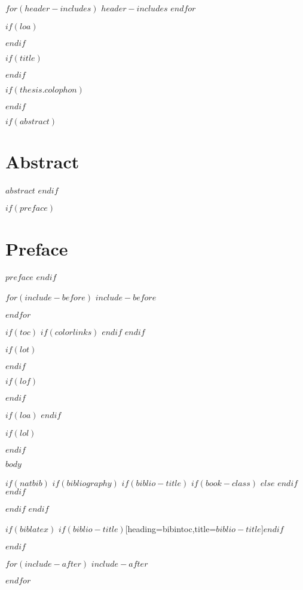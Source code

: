 $for(header-includes)$
  $header-includes$
$endfor$

$if(loa)$
\makeglossaries

$endif$



$if(title)$
\prefrontmatter

\cleartoevenpage

$endif$

$if(thesis.colophon)$

\cleartooddpage
$endif$

\frontmatter

$if(abstract)$
\chapter*{Abstract}
\setcounter{chapter}{0}
$abstract$
\clearforchapter
$endif$

$if(preface)$
\chapter*{Preface}
\setcounter{chapter}{0}
$preface$
\clearforchapter
$endif$

$for(include-before)$
$include-before$

$endfor$

$if(toc)$
{
$if(colorlinks)$
  \hypersetup{linkcolor=$if(toccolor)$$toccolor$$else$black$endif$}
$endif$
\setcounter{tocdepth}{$toc-depth$}
\tableofcontents
}
\clearforchapter
$endif$

$if(lot)$
\listoftables
\clearforchapter
$endif$

$if(lof)$
\listoffigures
\clearforchapter
$endif$

$if(loa)$
$endif$

$if(lol)$
\listoflistings
{}
\clearforchapter
$endif$

\mainmatter
$body$

\backmatter
$if(natbib)$
  $if(bibliography)$
  $if(biblio-title)$
  $if(book-class)$
  \renewcommand\bibname{$biblio-title$}
  $else$
  \renewcommand\refname{$biblio-title$}
  $endif$
  $endif$
  

  $endif$
$endif$

$if(biblatex)$
\printbibliography$if(biblio-title)$[heading=bibintoc,title={$biblio-title$}]$endif$

$endif$

$for(include-after)$
$include-after$

$endfor$


